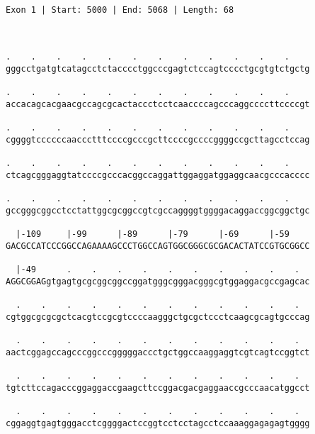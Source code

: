 \documentclass{article}
\begin{document}
 \begin{Verbatim}
 
Exon 1 | Start: 5000 | End: 5068 | Length: 68



.    .    .    .    .    .    .    .    .    .    .    .    
gggcctgatgtcatagcctctacccctggcccgagtctccagtcccctgcgtgtctgctg
                                                            
.    .    .    .    .    .    .    .    .    .    .    .    
accacagcacgaacgccagcgcactaccctcctcaaccccagcccaggccccttccccgt
                                                            
.    .    .    .    .    .    .    .    .    .    .    .    
cggggtccccccaaccctttccccgcccgcttccccgccccggggccgcttagcctccag
                                                            
.    .    .    .    .    .    .    .    .    .    .    .    
ctcagcgggaggtatccccgcccacggccaggattggaggatggaggcaacgcccacccc
                                                            
.    .    .    .    .    .    .    .    .    .    .    .    
gccgggcggcctcctattggcgcggccgtcgccaggggtggggacaggaccggcggctgc
                                                            
  |-109     |-99      |-89      |-79      |-69      |-59    
GACGCCATCCCGGCCAGAAAAGCCCTGGCCAGTGGCGGGCGCGACACTATCCGTGCGGCC
                                                            
  |-49      .    .    .    .    .    .    .    .    .    .  
AGGCGGAGgtgagtgcgcggcggccggatgggcgggacgggcgtggaggacgccgagcac
                                                            
  .    .    .    .    .    .    .    .    .    .    .    .  
cgtggcgcgcgctcacgtccgcgtccccaagggctgcgctccctcaagcgcagtgcccag
                                                            
  .    .    .    .    .    .    .    .    .    .    .    .  
aactcggagccagcccggcccgggggaccctgctggccaaggaggtcgtcagtccggtct
                                                            
  .    .    .    .    .    .    .    .    .    .    .    .  
tgtcttccagacccggaggaccgaagcttccggacgacgaggaaccgcccaacatggcct
                                                            
  .    .    .    .    .    .    .    .    .    .    .    .  
cggaggtgagtgggacctcggggactccggtcctcctagcctccaaaggagagagtgggg
                                                            

\end{Verbatim}
\end{document}
